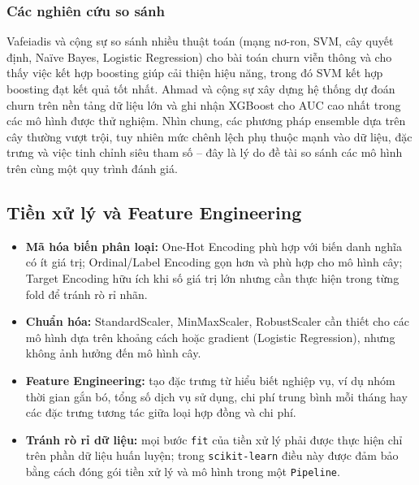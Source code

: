 \subsubsection{Các nghiên cứu so sánh}
Vafeiadis và cộng sự \cite{vafeiadis2015} so sánh nhiều thuật toán (mạng nơ-ron, SVM, cây quyết định, Naïve Bayes, Logistic Regression) cho bài toán churn viễn thông và cho thấy việc kết hợp boosting giúp cải thiện hiệu năng, trong đó SVM kết hợp boosting đạt kết quả tốt nhất. Ahmad và cộng sự \cite{ahmad2019} xây dựng hệ thống dự đoán churn trên nền tảng dữ liệu lớn và ghi nhận XGBoost cho AUC cao nhất trong các mô hình được thử nghiệm. Nhìn chung, các phương pháp ensemble dựa trên cây thường vượt trội, tuy nhiên mức chênh lệch phụ thuộc mạnh vào dữ liệu, đặc trưng và việc tinh chỉnh siêu tham số -- đây là lý do đề tài so sánh các mô hình trên cùng một quy trình đánh giá.

\subsection{Tiền xử lý và Feature Engineering}
\begin{itemize}
    \item \textbf{Mã hóa biến phân loại:} One-Hot Encoding phù hợp với biến danh nghĩa có ít giá trị; Ordinal/Label Encoding gọn hơn và phù hợp cho mô hình cây; Target Encoding hữu ích khi số giá trị lớn nhưng cần thực hiện trong từng fold để tránh rò rỉ nhãn.
    \item \textbf{Chuẩn hóa:} StandardScaler, MinMaxScaler, RobustScaler cần thiết cho các mô hình dựa trên khoảng cách hoặc gradient (Logistic Regression), nhưng không ảnh hưởng đến mô hình cây.
    \item \textbf{Feature Engineering:} tạo đặc trưng từ hiểu biết nghiệp vụ, ví dụ nhóm thời gian gắn bó, tổng số dịch vụ sử dụng, chi phí trung bình mỗi tháng hay các đặc trưng tương tác giữa loại hợp đồng và chi phí.
    \item \textbf{Tránh rò rỉ dữ liệu:} mọi bước \texttt{fit} của tiền xử lý phải được thực hiện chỉ trên phần dữ liệu huấn luyện; trong \texttt{scikit-learn} \cite{pedregosa2011} điều này được đảm bảo bằng cách đóng gói tiền xử lý và mô hình trong một \texttt{Pipeline}.
\end{itemize}

